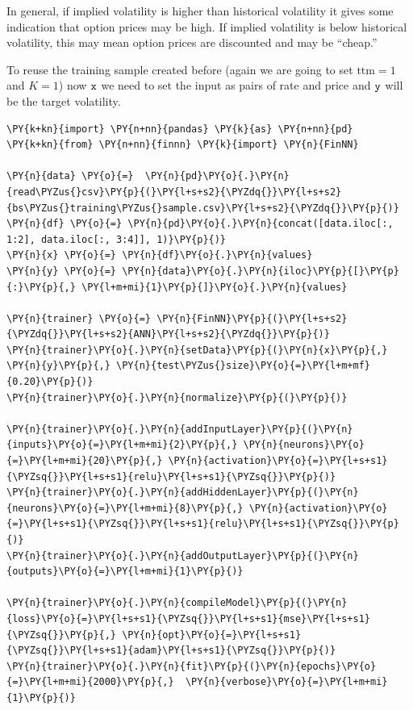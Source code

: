 In general, if implied volatility is higher than historical volatility it gives some indication that option prices may be high. If implied volatility is below historical volatility, this may mean option prices are discounted and may be “cheap.”

To reuse the training sample created before (again we
are going to set \(\mathrm{ttm}=1\) and \(K=1\)) now \(\tt{x}\) we need to set the input as pairs of rate and price and \(\tt{y}\) will be the target volatility.

\begin{codebox}[breakable, size=fbox, boxrule=1pt, pad at break*=1mm,colback=cellbackground, colframe=cellborder]
\begin{Verbatim}[commandchars=\\\{\}]
\PY{k+kn}{import} \PY{n+nn}{pandas} \PY{k}{as} \PY{n+nn}{pd}
\PY{k+kn}{from} \PY{n+nn}{finnn} \PY{k}{import} \PY{n}{FinNN}
	
\PY{n}{data} \PY{o}{=}  \PY{n}{pd}\PY{o}{.}\PY{n}{read\PYZus{}csv}\PY{p}{(}\PY{l+s+s2}{\PYZdq{}}\PY{l+s+s2}{bs\PYZus{}training\PYZus{}sample.csv}\PY{l+s+s2}{\PYZdq{}}\PY{p}{)}
\PY{n}{df} \PY{o}{=} \PY{n}{pd}\PY{o}{.}\PY{n}{concat([data.iloc[:, 1:2], data.iloc[:, 3:4]], 1)}\PY{p}{)}
\PY{n}{x} \PY{o}{=} \PY{n}{df}\PY{o}{.}\PY{n}{values}
\PY{n}{y} \PY{o}{=} \PY{n}{data}\PY{o}{.}\PY{n}{iloc}\PY{p}{[}\PY{p}{:}\PY{p}{,} \PY{l+m+mi}{1}\PY{p}{]}\PY{o}{.}\PY{n}{values}

\PY{n}{trainer} \PY{o}{=} \PY{n}{FinNN}\PY{p}{(}\PY{l+s+s2}{\PYZdq{}}\PY{l+s+s2}{ANN}\PY{l+s+s2}{\PYZdq{}}\PY{p}{)}
\PY{n}{trainer}\PY{o}{.}\PY{n}{setData}\PY{p}{(}\PY{n}{x}\PY{p}{,} \PY{n}{y}\PY{p}{,} \PY{n}{test\PYZus{}size}\PY{o}{=}\PY{l+m+mf}{0.20}\PY{p}{)}
\PY{n}{trainer}\PY{o}{.}\PY{n}{normalize}\PY{p}{(}\PY{p}{)}
	
\PY{n}{trainer}\PY{o}{.}\PY{n}{addInputLayer}\PY{p}{(}\PY{n}{inputs}\PY{o}{=}\PY{l+m+mi}{2}\PY{p}{,} \PY{n}{neurons}\PY{o}{=}\PY{l+m+mi}{20}\PY{p}{,} \PY{n}{activation}\PY{o}{=}\PY{l+s+s1}{\PYZsq{}}\PY{l+s+s1}{relu}\PY{l+s+s1}{\PYZsq{}}\PY{p}{)}
\PY{n}{trainer}\PY{o}{.}\PY{n}{addHiddenLayer}\PY{p}{(}\PY{n}{neurons}\PY{o}{=}\PY{l+m+mi}{8}\PY{p}{,} \PY{n}{activation}\PY{o}{=}\PY{l+s+s1}{\PYZsq{}}\PY{l+s+s1}{relu}\PY{l+s+s1}{\PYZsq{}}\PY{p}{)}
\PY{n}{trainer}\PY{o}{.}\PY{n}{addOutputLayer}\PY{p}{(}\PY{n}{outputs}\PY{o}{=}\PY{l+m+mi}{1}\PY{p}{)}

\PY{n}{trainer}\PY{o}{.}\PY{n}{compileModel}\PY{p}{(}\PY{n}{loss}\PY{o}{=}\PY{l+s+s1}{\PYZsq{}}\PY{l+s+s1}{mse}\PY{l+s+s1}{\PYZsq{}}\PY{p}{,} \PY{n}{opt}\PY{o}{=}\PY{l+s+s1}{\PYZsq{}}\PY{l+s+s1}{adam}\PY{l+s+s1}{\PYZsq{}}\PY{p}{)}
\PY{n}{trainer}\PY{o}{.}\PY{n}{fit}\PY{p}{(}\PY{n}{epochs}\PY{o}{=}\PY{l+m+mi}{2000}\PY{p}{,}  \PY{n}{verbose}\PY{o}{=}\PY{l+m+mi}{1}\PY{p}{)}
	

\end{Verbatim}
\end{codebox}
